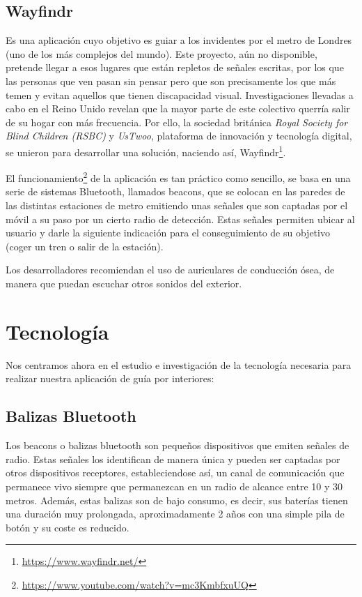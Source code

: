 \subsection{Wayfindr} %
Es una aplicación cuyo objetivo es guiar a los invidentes por el metro de Londres (uno de los más complejos del mundo). Este proyecto, aún no disponible, pretende llegar a esos lugares que están repletos de señales escritas, por los que las personas que ven pasan sin pensar pero que son precisamente los que más temen y evitan aquellos que tienen discapacidad visual. Investigaciones llevadas a cabo en el Reino Unido revelan que la mayor parte de este colectivo querría salir de su hogar con más frecuencia. Por ello, la sociedad británica \textit{Royal Society for Blind Children (RSBC)} y \textit{UsTwoo}, plataforma de innovación y tecnología digital, se unieron para desarrollar una solución, naciendo así, Wayfindr\footnote{\url{https://www.wayfindr.net/}}.

El funcionamiento\footnote{\url{https://www.youtube.com/watch?v=mc3KmbfxuUQ}} de la aplicación es tan práctico como sencillo, se basa en una serie de sistemas Bluetooth, llamados beacons, que se colocan en las paredes de las distintas estaciones de metro emitiendo unas señales que son captadas por el móvil a su paso por un cierto radio de detección. Estas señales permiten ubicar al usuario y darle la siguiente indicación para el conseguimiento de su objetivo (coger un tren o salir de la estación).

Los desarrolladores recomiendan el uso de auriculares de conducción ósea, de manera que puedan escuchar otros sonidos del exterior.

\section{Tecnología}
Nos centramos ahora en el estudio e investigación de la tecnología necesaria para realizar nuestra aplicación de guía por interiores:

\subsection{Balizas Bluetooth}

Los beacons o balizas bluetooth son pequeños dispositivos que emiten señales de radio. Estas señales los identifican de manera única y pueden ser captadas por otros dispositivos receptores, estableciendose así, un canal de comunicación que permanece vivo siempre que permanezcan en un radio de alcance entre 10 y 30 metros. Además, estas balizas son de bajo consumo, es decir, sus baterías tienen una duración muy prolongada, aproximadamente 2 años con una simple pila de botón y su coste es reducido.

